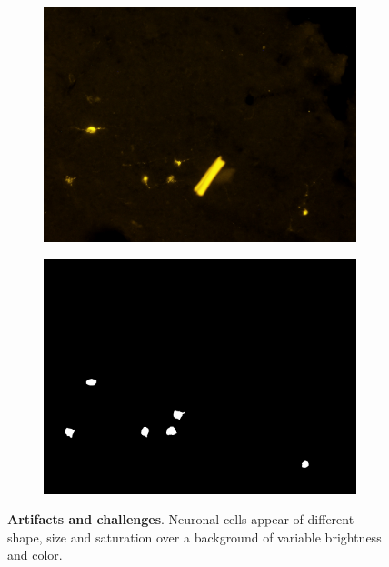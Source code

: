 \begin{figure}
\centering
\begin{subfigure}{0.55\textwidth}
\includegraphics[width=\linewidth]{figures/120_dataset/i_maccherone.jpeg}
\subcaption{}
\end{subfigure}%
\begin{subfigure}{0.55\textwidth}
\includegraphics[width=\linewidth]{figures/120_dataset/m_maccherone.png}
\subcaption{}
\label{fig:artifacts:macaroon}
\end{subfigure}
\vspace{-0.2cm}
\caption{
\textbf{Artifacts and challenges}. Neuronal cells appear of different shape, size and saturation over a background of variable brightness and color.
} 
\label{fig:artifacts}
\end{figure}
